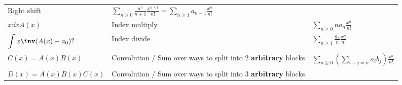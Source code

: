 \begin{longtable}[]{@{}lll@{}}
\begin{minipage}[t]{0.30\columnwidth}
Right shift\strut
\end{minipage} & \begin{minipage}[t]{0.30\columnwidth}\raggedright
\(\displaystyle\sum_{n\geq 0}\frac {a^{n}} {n+1} \frac{x^{n+1}}{n!} = \displaystyle\sum_{n\geq 1} a_{n-1} \frac{x^n}{n!}\)\strut
\end{minipage}\tabularnewline
\begin{minipage}[t]{0.30\columnwidth}\raggedright
\(x\dd{}{x}A(x)\)\strut
\end{minipage} & \begin{minipage}[t]{0.30\columnwidth}\raggedright
Index multiply\strut
\end{minipage} & \begin{minipage}[t]{0.30\columnwidth}\raggedright
\(\displaystyle\sum_{n\geq 0}n a_{n} \frac{x^n}{n!}\)\strut
\end{minipage}\tabularnewline
\begin{minipage}[t]{0.30\columnwidth}\raggedright
\(\displaystyle\int x\inv (A(x) - a_0)?\)\strut
\end{minipage} & \begin{minipage}[t]{0.30\columnwidth}\raggedright
Index divide\strut
\end{minipage} & \begin{minipage}[t]{0.30\columnwidth}\raggedright
\(\displaystyle\sum_{n\geq 1} \frac{a_n}{n} \frac{x^n}{n!}\)\strut
\end{minipage}\tabularnewline
\begin{minipage}[t]{0.30\columnwidth}\raggedright
\(C(x) = A(x)B(x)\)\strut
\end{minipage} & \begin{minipage}[t]{0.30\columnwidth}\raggedright
Convolution / Sum over ways to split into 2 \textbf{arbitrary}
blocks\strut
\end{minipage} & \begin{minipage}[t]{0.30\columnwidth}\raggedright
\(\displaystyle\sum_{n\geq 0} \left( \displaystyle\sum_{i+j=n} a_i b_j\right) \frac{x^n}{n!}\)\strut
\end{minipage}\tabularnewline
\begin{minipage}[t]{0.30\columnwidth}\raggedright
\(D(x) = A(x)B(x)C(x)\)\strut
\end{minipage} & \begin{minipage}[t]{0.30\columnwidth}\raggedright
Convolution / Sum over ways to split into 3 \textbf{arbitrary}
blocks\strut
\end{minipage} & \begin{minipage}[t]{0.30\columnwidth}\raggedright

\end{minipage}
\end{longtable}
